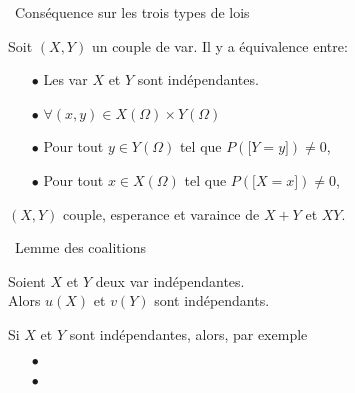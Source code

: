 \documentclass[a4paper, 11pt]{article}
\begin{document}
\vspace{0.3cm}

\noindent\ {Cons\'equence sur les trois types de lois}\\

 {\noindent  

\begin{prop} 
Soit $(X,Y)$ un couple de var. Il y a \'equivalence entre:
\begin{itemize}
 \item[$\bullet$] Les var $X$ et $Y$ sont ind\'ependantes.\vsec
\item[$\bullet$] $\forall (x,y)\in X(\Omega)\times Y(\Omega)$ \dotfill \vsec
\item[$\bullet$] Pour tout $y\in Y(\Omega)$ tel que $P(\lbrack Y=y\rbrack)\not= 0$, \dotfill \vsec
\item[$\bullet$] Pour tout $x\in X(\Omega)$ tel que $P(\lbrack X=x\rbrack)\not= 0$, \dotfill \vsec
\end{itemize}
\end{prop}
 
}\vsec

\begin{prop}
$(X,Y)$ couple, esperance et varaince de $X+Y$ et $XY$. 
\end{prop}
\vspace{0.3cm}

\noindent\ {Lemme des coalitions}\\


\begin{prop} 
Soient $X$ et $Y$ deux var ind\'ependantes.\vsec\\ 
Alors $u(X)$ et $v(Y)$ sont indépendants. 
\end{prop}
 


\begin{exemples}
Si $X$ et $Y$ sont ind\'ependantes, alors, par exemple
\begin{itemize}
 \item[$\bullet$] \dotfill\vsec
\item[$\bullet$] \dotfill\vsec
\end{itemize}
\end{exemples}

\end{document}
